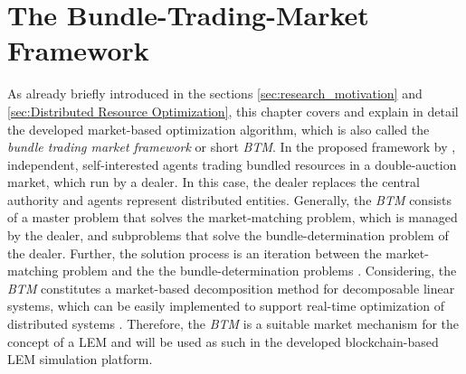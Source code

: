 \section{The Bundle-Trading-Market Framework}
As already briefly introduced in the sections \ref{sec:research_motivation} 
and \ref{sec:Distributed Resource Optimization}, this chapter covers and explain in detail
the developed market-based optimization algorithm, which is also called the 
\textit{bundle trading market framework} or short \textit{BTM}. 
In the proposed framework by , independent, self-interested
agents trading bundled resources in a double-auction market, which run by a dealer. 
In this case, the dealer replaces the central authority and agents represent distributed
entities. Generally, the \textit{BTM} consists of a master problem that solves 
the market-matching problem, which is managed by the dealer, 
and  subproblems that solve the bundle-determination problem of the dealer.
Further, the solution process is an iteration between the market-matching problem and the 
the bundle-determination problems .
Considering, the \textit{BTM} constitutes a market-based decomposition method for decomposable linear systems,
which can be easily implemented to support real-time optimization of distributed systems .
Therefore, the \textit{BTM} is a suitable market mechanism for the concept of a LEM and will be used
as such in the developed blockchain-based LEM simulation platform. 


